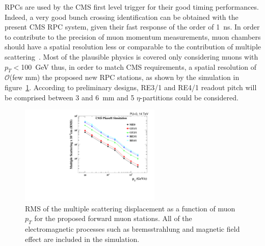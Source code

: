 RPCs are used by the CMS first level trigger for their good timing performances. Indeed, a very good bunch crossing identification can be obtained with the present CMS RPC system, given their fast response of the order of \SI{1}{ns}. In order to contribute to the precision of muon momentum measurements, muon chambers should have a spatial resolution less or comparable to the contribution of multiple scattering~\cite{MUONTDR}. Most of the plausible physics is covered only considering muons with $p_T<$\SI{100}{GeV} thus, in order to match CMS requirements, a spatial resolution of $\mathcal{O}$(few $\mathrm{mm}$) the proposed new RPC stations, as shown by the simulation in figure~\ref{fig:MultiScat}. According to preliminary designs, RE3/1 and RE4/1 readout pitch will be comprised between 3 and \SI{6}{mm} and 5 $\eta$-partitions could be considered.

\begin{figure}[H]
	\centering
	\includegraphics[width=0.6\textwidth]{fig/MS_allstations.pdf}
	\caption{\label{fig:MultiScat}  RMS of the multiple scattering displacement as a function of muon $p_T$ for the  proposed forward muon stations. All of the electromagnetic processes such as bremsstrahlung and magnetic field effect are included in the simulation.}
\end{figure}

\clearpage{\pagestyle{empty}\cleardoublepage}
